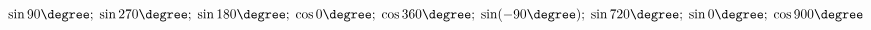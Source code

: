 \begin{ex}[type=calculate]
	\begin{condition}
		\( \sin90\degree;\;\sin270\degree;\;\sin180\degree;\;\cos0\degree;\;\cos360\degree;\;\sin(-90\degree);\;\sin720\degree;\;\sin0\degree;\;\cos900\degree \)
	\end{condition}
\end{ex}